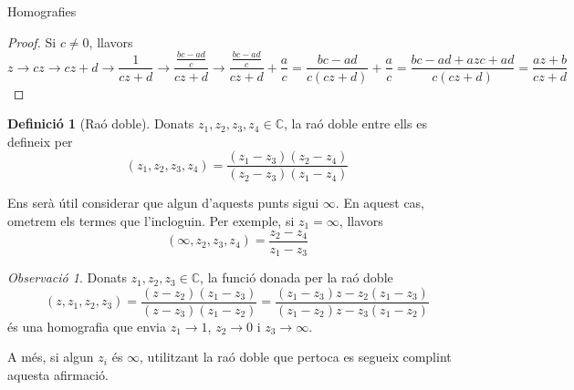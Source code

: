 \documentclass[dvipsnames, svgnames]{article}
\theoremstyle{definition}
\newtheorem*{definition}{Definició}
\theoremstyle{remark}
\newtheorem*{remark}{Observació}
\begin{document}
\begin{section}{Homografies}
\begin{proof}
            Si $c\neq0$, llavors \begin{displaymath}
                z\to cz\to cz+d\to \frac{1}{cz+d}\to \frac{\frac{bc-ad}{c}}{cz+d}\to \frac{\frac{bc-ad}{c}}{cz+d}+\frac{a}{c}=\frac{bc-ad}{c(cz+d)}+\frac{a}{c}=\frac{bc-ad+azc+ad}{c(cz+d)}=\frac{az+b}{cz+d}
            \end{displaymath}
        \end{proof}
        \begin{definition}[Raó doble]
            Donats $z_1,z_2,z_3,z_4\in\mathbb{C}$, la raó doble entre ells es defineix per \begin{displaymath}
                (z_1,z_2,z_3,z_4) = \frac{(z_1-z_3)(z_2-z_4)}{(z_2-z_3)(z_1-z_4)}
            \end{displaymath}
            
            Ens serà útil considerar que algun d'aquests punts sigui $\infty$. En aquest cas, ometrem els termes que l'incloguin. Per exemple, si $z_1 = \infty$, llavors \begin{displaymath}
                (\infty, z_2,z_3,z_4) = \frac{z_2-z_4}{z_1-z_3}
            \end{displaymath}
        \end{definition}
    \end{section}
    \begin{remark}
        Donats $z_1,z_2,z_3\in\mathbb{C}$, la funció donada per la raó doble \begin{displaymath}
            (z,z_1,z_2,z_3) = \frac{(z-z_2)(z_1-z_3)}{(z-z_3)(z_1-z_2)}=\frac{(z_1-z_3)z-z_2(z_1-z_3)}{(z_1-z_2)z-z_3(z_1-z_2)}
        \end{displaymath}
        és una homografia que envia $z_1\to1$, $z_2\to0$ i $z_3\to\infty$.

        A més, si algun $z_i$ és $\infty$, utilitzant la raó doble que pertoca es segueix complint aquesta afirmació.
    \end{remark}
\end{document}
